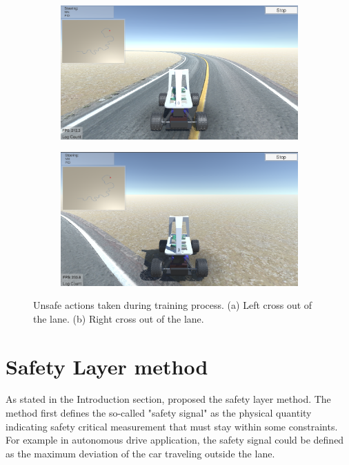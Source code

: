 \documentclass{article} %
\begin{document}
\begin{figure}[ht]
\centering
\begin{subfigure}[b]{0.45\textwidth}
\centering
\includegraphics[width=\textwidth]{fig2a_left_cross.png}
\caption{}
\label{fig:gull}
\end{subfigure}%
\begin{subfigure}[b]{0.45\textwidth}
\centering
\includegraphics[width=\textwidth]{fig2b_right_cross.png}
\caption{}
\label{fig:gull}
\end{subfigure}%
\caption{Unsafe actions taken during training process. (a) Left cross out of the lane. (b) Right cross out of the lane.}
\end{figure}


\section{Safety Layer method}
As stated in the Introduction section, \cite{dalal2018safe} proposed the safety layer method. The method first defines the so-called "safety signal" as the physical quantity indicating safety critical measurement that must stay within some constraints. For example in autonomous drive application, the safety signal could be defined as the maximum deviation of the car traveling outside the lane. 
\end{document}
